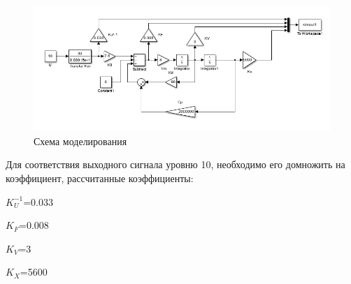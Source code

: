 \documentclass[a4paper, 12pt]{article}
\begin{document}
\begin{figure}[h]
	\centering
	\includegraphics[width=1\linewidth]{0}
	\caption{Схема моделирования}
	\label{fig:0}
\end{figure}
Для соответствия выходного сигнала уровню 10, необходимо его домножить на коэффициент, рассчитанные коэффициенты:\par
$K_{U}^{-1}$=0.033\par
$K_{F}$=0.008\par
$K_{V}$=3\par
$K_{X}$=5600\par
 
\end{document}
